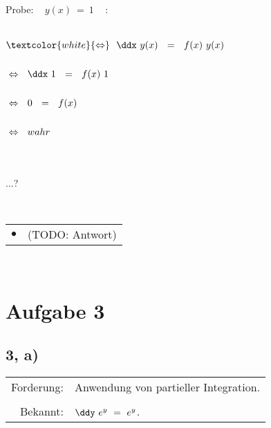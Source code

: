 \begin{enumerate}
	
	\newpage
	
	
	Probe: ~ $y(x) ~ = ~ 1$ ~ :
	
	~\\
	
	$\begin{aligned}[t]
	&\textcolor{white}{\Leftrightarrow} ~~ \ddx ~ y(x) ~~ = ~~ f(x) ~  y(x) \\ \\
	&\Leftrightarrow ~~ \ddx ~ 1 ~~ = ~~ f(x) ~  1 \\ \\
	&\Leftrightarrow ~~ 0 ~~ = ~~ f(x) \\ \\
	&\Leftrightarrow ~~ wahr
	\end{aligned}$
	
	~\\
	~\\
	
	...?
	
	~\\
	
	\begin{tabularx}{0.88\textwidth}{lX}
		$\bullet$ & (TODO: Antwort)
	\end{tabularx}
	
	~\\

	
	
\end{enumerate}


\newpage


\section*{Aufgabe 3}


\newpage



\subsection*{3, a)}


	\begin{longtable}[l]{rl}
		
		Forderung:  &  Anwendung von partieller Integration. \\
		
		\\
		
		  Bekannt:  &  $\ddy ~ e^y ~ = ~ e^y$.
		
	\end{longtable}
	
